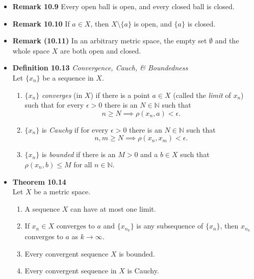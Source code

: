 \documentclass[11pt,a4paper]{article}
\begin{document}
\begin{itemize}
    \item \textbf{Remark 10.9}
        Every open ball is open, and every closed ball is closed.

    \item \textbf{Remark 10.10}
        If $a \in X$, then $X \setminus \{a\}$ is open, and $\{a\}$ is closed.

    \item \textbf{Remark (10.11)}
        In an arbitrary metric space, the empty set $\emptyset$ and the whole space $X$
        are both open and closed.

    \item \textbf{Definition 10.13} \emph{Convergence, Cauch, \& Boundedness} \\
        Let $\{x_n\}$ be a sequence in $X$.
        \begin{enumerate}
            \item $\{x_n\}$ \emph{converges} (in $X$) if there is a point $a \in X$
                (called the \emph{limit} of $x_n$) such that for every $\epsilon > 0$
                there is an $N \in \mathbb{N}$ such that
                \[
                    n \geq N \implies \rho(x_n, a) < \epsilon.
                \]
            \item $\{x_n\}$ is \emph{Cauchy} if for every $\epsilon > 0$ there is an
                $N \in \mathbb{N}$ such that
                \[
                    n, m \geq N \implies \rho(x_n, x_m) < \epsilon.
                \]
            \item $\{x_n\}$ is \emph{bounded} if there is an $M > 0$ and a $b \in X$ such that
                $\rho (x_n, b) \leq M$ for all $n \in \mathbb{N}$.
        \end{enumerate}

    \item \textbf{Theorem 10.14} \\
        Let $X$ be a metric space.
        \begin{enumerate}
            \item A sequence $X$ can have at most one limit.
            \item If $x_n \in X$ converges to $a$ and $\{x_n_k\}$ is any subsequence of
                $\{x_n\}$, then $x_n_k$ converges to $a$ as $k \to \infty$.
            \item Every convergent sequence $X$ is bounded.
            \item Every convergent sequence in $X$ is Cauchy.
        \end{enumerate}


\end{itemize}
\end{document}
